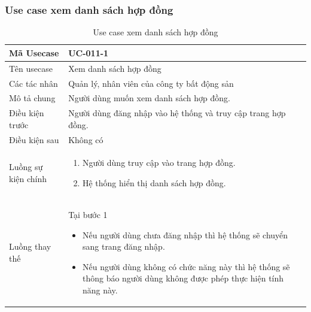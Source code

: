 \documentclass[12pt,a4paper]{article}
\begin{document}
    \subsubsection*{Use case xem danh sách hợp đồng }
    \begin{table}[H]
        \centering
        \begin{tabular}{|p{3.5cm}|p{11.5cm}|c|}
            \hline
            Mã Usecase      & UC-011-1                                                      \\
            \hline
            Tên usecase     & Xem danh sách hợp đồng                                        \\
            \hline
            Các tác nhân    & Quản lý, nhân viên của công ty bất động sản                   \\
            \hline
            Mô tả chung     & Người dùng muốn xem danh sách hợp đồng.                       \\
            \hline

            Điều kiện trước & Người dùng đăng nhập vào hệ thống và truy cập trang hợp đồng. \\
            \hline

            Điều kiện sau   & Không có                                                      \\
            \hline

            Luồng sự kiện chính & \vspace{-.8cm}\begin{enumerate}
                                                    \item Người dùng truy cập vào trang hợp đồng.
                                                    \item Hệ thống hiển thị danh sách hợp đồng.
            \end{enumerate}
            \\
            \hline
            Luồng thay thế & Tại bước 1\newline
            \vspace{-.8cm}\begin{itemize}
                              \item Nếu người dùng chưa đăng nhập thì hệ thống sẽ chuyển sang trang đăng nhập.
                              \item  Nếu người dùng không có chức năng này thì hệ thống sẽ thông báo người dùng không được phép thực hiện tính năng này.
            \end{itemize}

            \\    \hline
        \end{tabular}
        \caption{Use case xem danh sách hợp đồng }
    \end{table}
\end{document}
